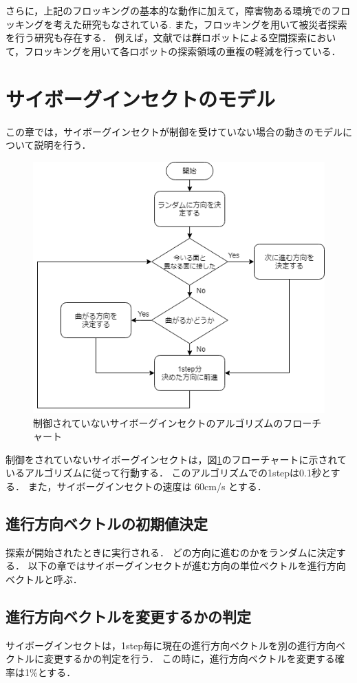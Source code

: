 \documentclass[a4paper,11pt]{jarticle}
\begin{document}
	さらに，上記のフロッキングの基本的な動作に加えて，障害物ある環境でのフロッキングを考えた研究もなされている\cite{obstacle}.
	また，フロッキングを用いて被災者探索を行う研究も存在する．
	例えば，文献\cite{exploration}では群ロボットによる空間探索において，フロッキングを用いて各ロボットの探索領域の重複の軽減を行っている．	
	\section{サイボーグインセクトのモデル}
	\label{sec:algorithm}
	この章では，サイボーグインセクトが制御を受けていない場合の動きのモデルについて説明を行う．
	\begin{figure}
		\centering
		\includegraphics[width=0.7\linewidth]{png/Untitled.png}
		\caption[アルゴリズムのフローチャート]{制御されていないサイボーグインセクトのアルゴリズムのフローチャート}
		\label{fig:algorithm}
	\end{figure}
	
	制御をされていないサイボーグインセクトは，図\ref{fig:algorithm}のフローチャートに示されているアルゴリズムに従って行動する．
	このアルゴリズムでの1stepは0.1秒とする．
	また，サイボーグインセクトの速度は 60cm/s とする\cite{speed}．
	
	\subsection{進行方向ベクトルの初期値決定}
	\label{random}
	探索が開始されたときに実行される．
	どの方向に進むのかをランダムに決定する．
	以下の章ではサイボーグインセクトが進む方向の単位ベクトルを進行方向ベクトルと呼ぶ．
		
	\subsection{進行方向ベクトルを変更するかの判定}
	\label{carb}
	サイボーグインセクトは，1step毎に現在の進行方向ベクトルを別の進行方向ベクトルに変更するかの判定を行う．
	この時に，進行方向ベクトルを変更する確率は1\%とする．
	
\end{document}
